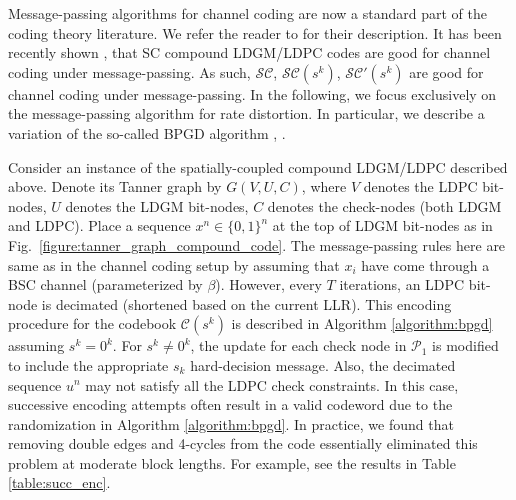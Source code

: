 Message-passing algorithms for channel coding are now a standard part of the coding theory literature.
We refer the reader to \cite{RU-2008} for their description.
It has been recently shown \cite{Obata-isit13}, \cite{Sakaniwa-arxiv11} that SC compound LDGM/LDPC codes are good for channel coding under message-passing.
As such, $\mathcal{SC}$, $\mathcal{SC}(s^k)$, $\mathcal{SC}'(s^k)$ are good for channel coding under message-passing.
In the following, we focus exclusively on the message-passing algorithm for rate distortion.
In particular, we describe a variation of the so-called BPGD algorithm \cite{Aref-arxiv13}, \cite{Aref-isit12}.

Consider an instance of the spatially-coupled compound LDGM/LDPC described above.
Denote its Tanner graph by $G(V,U,C)$, where $V$ denotes the LDPC bit-nodes, $U$ denotes the LDGM bit-nodes, $C$ denotes the check-nodes (both LDGM and LDPC).
Place a sequence $x^n \in \{0,1\}^n$ at the top of LDGM bit-nodes as in Fig.~\ref{figure:tanner_graph_compound_code}.
The message-passing rules here are same as in the channel coding setup by assuming that $x_i$ have come through a BSC channel (parameterized by $\beta$).
However, every $T$ iterations, an LDPC bit-node is decimated (shortened based on the current LLR).
This encoding procedure for the codebook $\mathcal{C}(s^k)$ is described in Algorithm \ref{algorithm:bpgd} assuming $s^k = 0^k$.
For $s^k \neq 0^k$, the update for each check node in $\mathcal{P}_1$ is modified to include the appropriate $s_k$ hard-decision message.
Also, the decimated sequence $u^n$ may not satisfy all the LDPC check constraints.
In this case, successive encoding attempts often result in a valid codeword due to the randomization in Algorithm \ref{algorithm:bpgd}.
In practice, we found that removing double edges and 4-cycles from the code essentially eliminated this problem at moderate block lengths.
For example, see the results in Table \ref{table:succ_enc}.

